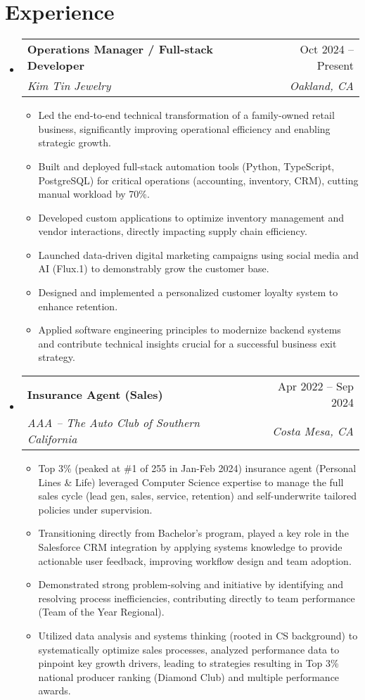 \documentclass[letterpaper,10pt]{article}
\makeatletter
\newcommand{\resumeItem}[1]{
  \item\small{ {#1 \vspace{-4pt}} } %
}
\newcommand{\resumeSubheading}[4]{
  \vspace{-3pt}\item %
  \begin{tabular*}{0.97\textwidth}[t]{l@{\extracolsep{\fill}}r} %
    \textbf{#1} & #2 \\
    \textit{\small#3} & \textit{\small #4} \\
  \end{tabular*}\vspace{-8pt} %
}
\newcommand{\resumeItemListStart}{\begin{itemize}}
\newcommand{\resumeItemListEnd}{\end{itemize}\vspace{-7pt}} %
\newcommand{\resumeSubHeadingListStart}{\begin{itemize}[leftmargin=0.15in, label={}]} %
\newcommand{\resumeSubHeadingListEnd}{\end{itemize}} %
\makeatother
\begin{document}
\section{Experience}
  \resumeSubHeadingListStart
    \resumeSubheading
      {Operations Manager / Full-stack Developer}{Oct 2024 – Present}
      {Kim Tin Jewelry}{Oakland, CA}
      \resumeItemListStart
        \resumeItem{Led the end-to-end technical transformation of a family-owned retail business, significantly improving operational efficiency and enabling strategic growth.}
        \resumeItem{Built and deployed full-stack automation tools (Python, TypeScript, PostgreSQL) for critical operations (accounting, inventory, CRM), cutting manual workload by 70\%.} %
        \resumeItem{Developed custom applications to optimize inventory management and vendor interactions, directly impacting supply chain efficiency.}
        \resumeItem{Launched data-driven digital marketing campaigns using social media and AI (Flux.1) to demonstrably grow the customer base.}
        \resumeItem{Designed and implemented a personalized customer loyalty system to enhance retention.}
        \resumeItem{Applied software engineering principles to modernize backend systems and contribute technical insights crucial for a successful business exit strategy.}
      \resumeItemListEnd

    \resumeSubheading
      {Insurance Agent (Sales)}{Apr 2022 – Sep 2024}
      {AAA – The Auto Club of Southern California}{Costa Mesa, CA}
      \resumeItemListStart
        \resumeItem{ Top 3\% (peaked at \#1 of 255 in Jan-Feb 2024) insurance agent (Personal Lines \& Life) leveraged Computer Science expertise to manage the full sales cycle (lead gen, sales, service, retention) and self-underwrite tailored policies under supervision.} %
        \resumeItem{Transitioning directly from Bachelor's program, played a key role in the Salesforce CRM integration by applying systems knowledge to provide actionable user feedback, improving workflow design and team adoption.}
        \resumeItem{Demonstrated strong problem-solving and initiative by identifying and resolving process inefficiencies, contributing directly to team performance (Team of the Year Regional).}
        \resumeItem{Utilized data analysis and systems thinking (rooted in CS background) to systematically optimize sales processes, analyzed performance data to pinpoint key growth drivers, leading to strategies resulting in Top 3\% national producer ranking (Diamond Club) and multiple performance awards.} %
      \resumeItemListEnd
  \resumeSubHeadingListEnd
\end{document}

